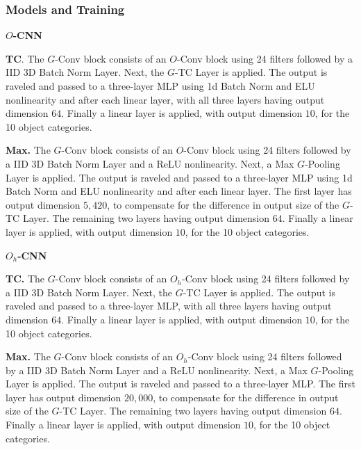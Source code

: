 



\subsubsection{Models and Training}

\textbf{$O$-CNN}



\textbf{TC}. The $G$-Conv block consists of an $O$-Conv block using 24 filters followed by a IID 3D Batch Norm Layer. Next, the $G$-TC Layer is applied. The output is raveled and passed to a three-layer MLP using 1d Batch Norm and ELU nonlinearity and after each linear layer, with all three layers having output dimension $64$. Finally a linear layer is applied, with output dimension $10$, for the 10 object categories.

\textbf{Max.} The $G$-Conv block consists of an $O$-Conv block using 24 filters followed by a IID 3D Batch Norm Layer and a ReLU nonlinearity. Next, a Max $G$-Pooling Layer is applied. The output is raveled and passed to a three-layer MLP using 1d Batch Norm and ELU nonlinearity and after each linear layer. The first layer has output dimension $5,420$, to compensate for the difference in output size of the $G$-TC Layer. The remaining two layers having output dimension $64$. Finally a linear layer is applied, with output dimension $10$, for the 10 object categories.


\textbf{$O_h$-CNN}





\textbf{TC.} The $G$-Conv block consists of an $O_h$-Conv block using 24 filters followed by a IID 3D Batch Norm Layer. Next, the $G$-TC Layer is applied. The output is raveled and passed to a three-layer MLP, with all three layers having output dimension $64$. Finally a linear layer is applied, with output dimension $10$, for the 10 object categories.



\textbf{Max.} The $G$-Conv block consists of an $O_h$-Conv block using 24 filters followed by a IID 3D Batch Norm Layer and a ReLU nonlinearity. Next, a Max $G$-Pooling Layer is applied. The output is raveled and passed to a three-layer MLP. The first layer has output dimension $20,000$, to compensate for the difference in output size of the $G$-TC Layer. The remaining two layers having output dimension $64$. Finally a linear layer is applied, with output dimension $10$, for the 10 object categories.




